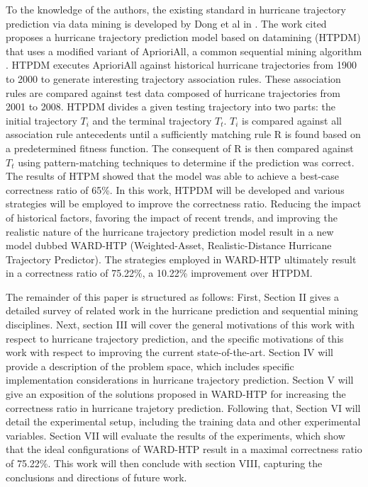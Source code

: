 \documentclass[12pt,conference]{IEEEtran}
\begin{document}
To the knowledge of the authors, the existing standard in hurricane trajectory prediction via data mining is developed by Dong et al in \cite{major-hurricane-model}. The work cited proposes a hurricane trajectory prediction model based on datamining (HTPDM) that uses a modified variant of AprioriAll, a common sequential mining algorithm \cite{AprioriAll-original}. HTPDM executes AprioriAll against historical hurricane trajectories from 1900 to 2000 to generate interesting trajectory association rules. These association rules are compared against test data composed of hurricane trajectories from 2001 to 2008. HTPDM divides a given testing trajectory into two parts: the initial trajectory $T_{i}$ and the terminal trajectory $T_{t}$. $T_{i}$ is compared against all association rule antecedents until a sufficiently matching rule R is found based on a predetermined fitness function. The consequent of R is then compared against $T_{t}$ using pattern-matching techniques to determine if the prediction was correct. The results of HTPM showed that the model was able to achieve a best-case correctness ratio of 65\%. In this work, HTPDM will be developed and various strategies will be employed to improve the correctness ratio. Reducing the impact of historical factors, favoring the impact of recent trends, and improving the realistic nature of the hurricane trajectory prediction model result in a new model dubbed WARD-HTP (Weighted-Asset, Realistic-Distance Hurricane Trajectory Predictor). The strategies employed in WARD-HTP ultimately result in a correctness ratio of 75.22\%, a 10.22\% improvement over HTPDM.

The remainder of this paper is structured as follows: First, Section II gives a detailed survey of related work in the hurricane prediction and sequential mining disciplines. Next, section III will cover the general motivations of this work with respect to hurricane trajectory prediction, and the specific motivations of this work with respect to improving the current state-of-the-art. Section IV will provide a description of the problem space, which includes specific implementation considerations in hurricane trajectory prediction. Section V will give an exposition of the solutions proposed in WARD-HTP for increasing the correctness ratio in hurricane trajetory prediction. Following that, Section VI will detail the experimental setup, including the training data and other experimental variables. Section VII will evaluate the results of the experiments, which show that the ideal configurations of WARD-HTP result in a maximal correctness ratio of 75.22\%. This work will then conclude with section VIII, capturing the conclusions and directions of future work.
\end{document}
